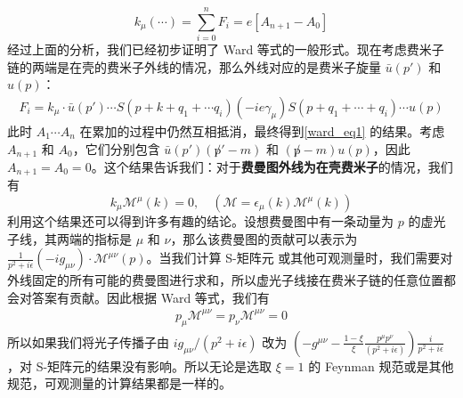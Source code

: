 \begin{equation}\label{ward_eq1}
k_\mu (\cdots) = \sum_{i=0}^n F_i = e[A_{n+1}-A_0]
\end{equation}
经过上面的分析，我们已经初步证明了 Ward 等式的一般形式。现在考虑费米子链的两端是在壳的费米子外线的情况，那么外线对应的是费米子旋量 $\bar u(p')$ 和 $u(p)$：
\begin{equation}
\begin{aligned}
F_i = k_\mu \cdot \bar u(p')\cdots S(p+k+q_1+\cdots q_i)(-ie\gamma_\mu)S(p+q_1+\cdots + q_i)\cdots u(p)
\end{aligned}
\end{equation}
此时 $A_1\cdots A_n$ 在累加的过程中仍然互相抵消，最终得到\autoref{ward_eq1} 的结果。考虑 $A_{n+1}$ 和 $A_0$，它们分别包含 $\bar u(p')(\not p'-m)$ 和 $(\not p-m)u(p)$，因此 $A_{n+1}=A_0=0$。这个结果告诉我们：对于\textbf{费曼图外线为在壳费米子}的情况，我们有
\begin{equation}
k_\mu \mathcal{M}^\mu(k) = 0,\quad (\mathcal{M} = \epsilon_\mu(k)\mathcal{M}^\mu(k))
\end{equation}
利用这个结果还可以得到许多有趣的结论。设想费曼图中有一条动量为 $p$ 的虚光子线，其两端的指标是 $\mu$ 和 $\nu$，那么该费曼图的贡献可以表示为 $\frac{1}{p^2+i\epsilon}(-ig_{\mu\nu})\cdot\mathcal{M}^{\mu\nu}(p)$。当我们计算 S-矩阵元 或其他可观测量时，我们需要对外线固定的所有可能的费曼图进行求和，所以虚光子线接在费米子链的任意位置都会对答案有贡献。因此根据 Ward 等式，我们有
\begin{equation}
\begin{aligned}
p_\mu \mathcal{M}^{\mu\nu} = p_\nu\mathcal{M}^{\mu\nu}= 0
\end{aligned}
\end{equation}
所以如果我们将光子传播子由 $ig_{\mu\nu}/(p^2+i\epsilon)$ 改为 $\left(-g^{\mu\nu}-\frac{1-\xi}{\xi}\frac{p^\mu p^\nu}{ (p^2+i\epsilon)}\right)\frac{i}{p^2+i\epsilon}$，对 S-矩阵元的结果没有影响。所以无论是选取 $\xi=1$ 的 Feynman 规范或是其他规范，可观测量的计算结果都是一样的。

